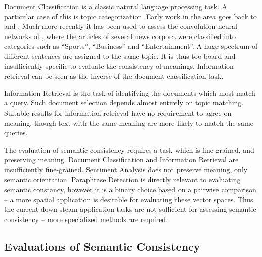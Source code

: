 \documentclass[]{book}
\begin{document}
Document Classification is a classic natural language processing task.
A particular case of this is topic categorization. Early work in the
area goes back to \cite{maron1961automatic} and \cite{borko1963automatic}.
Much more recently it has been used to assess the convolution neural
networks of \cite{DBLP:journals/corr/ZhangL15}, where the articles
of several news corpora were classified into categories such as ``Sports'',
``Business'' and ``Entertainment''. A huge spectrum of different
sentences are assigned to the same topic. It is thus too board and
insufficiently specific to evaluate the consistency of meanings. Information
retrieval can be seen as the inverse of the document classification
task.

Information Retrieval is the task of identifying the documents which
most match a query. Such document selection depends almost entirely
on topic matching. Suitable results for information retrieval have
no requirement to agree on meaning, though text with the same meaning
are more likely to match the same queries.

The evaluation of semantic consistency requires a task which is fine
grained, and preserving meaning. Document Classification and Information
Retrieval are insufficiently fine-grained. Sentiment Analysis does
not preserve meaning, only semantic orientation. Paraphrase Detection
is directly relevant to evaluating semantic constancy, however it
is a binary choice based on a pairwise comparison -- a more spatial
application is desirable for evaluating these vector spaces. Thus
the current down-steam application tasks are not sufficient for assessing
semantic consistency -- more specialized methods are required.


\subsection{Evaluations of Semantic Consistency\label{sub:Evaluations-of-Semantic}}
\end{document}
